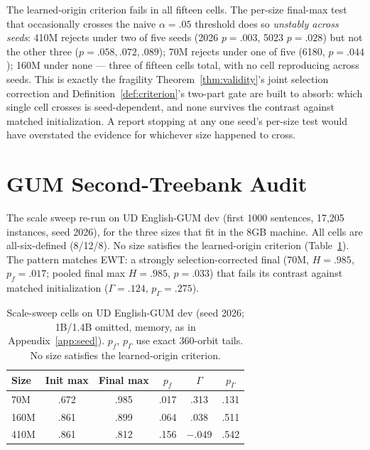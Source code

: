 \documentclass[11pt]{article}
\begin{document}
The learned-origin criterion fails in all fifteen cells. The per-size final-max test that occasionally crosses the naive $\alpha=.05$ threshold does so \emph{unstably across seeds}: 410M rejects under two of five seeds (2026 $p=.003$, 5023 $p=.028$) but not the other three ($p=.058,.072,.089$); 70M rejects under one of five (6180, $p=.044$); 160M under none --- three of fifteen cells total, with no cell reproducing across seeds. This is exactly the fragility Theorem~\ref{thm:validity}'s joint selection correction and Definition~\ref{def:criterion}'s two-part gate are built to absorb: which single cell crosses is seed-dependent, and none survives the contrast against matched initialization. A report stopping at any one seed's per-size test would have overstated the evidence for whichever size happened to cross.

\section{GUM Second-Treebank Audit}
\label{app:gum}
The scale sweep re-run on UD English-GUM dev (first 1000 sentences, 17{,}205 instances, seed 2026), for the three sizes that fit in the 8GB machine. All cells are all-six-defined (8/12/8). No size satisfies the learned-origin criterion (Table~\ref{tab:gum}). The pattern matches EWT: a strongly selection-corrected final (70M, $H=.985$, $p_f=.017$; pooled final max $H=.985$, $p=.033$) that fails its contrast against matched initialization ($\Gamma=.124$, $p_\Gamma=.275$).

\begin{table}[h]
\centering\small
\setlength{\tabcolsep}{5pt}
\begin{tabular}{lccccc}
\toprule
Size & Init max & Final max & $p_f$ & $\Gamma$ & $p_\Gamma$ \\
\midrule
70M  & .672 & .985 & .017 & .313    & .131 \\
160M & .861 & .899 & .064 & .038    & .511 \\
410M & .861 & .812 & .156 & $-$.049 & .542 \\
\bottomrule
\end{tabular}
\caption{Scale-sweep cells on UD English-GUM dev (seed 2026; 1B/1.4B omitted, memory, as in Appendix~\ref{app:seed}). $p_f$, $p_\Gamma$ use exact 360-orbit tails. No size satisfies the learned-origin criterion.}
\label{tab:gum}
\end{table}
\end{document}
